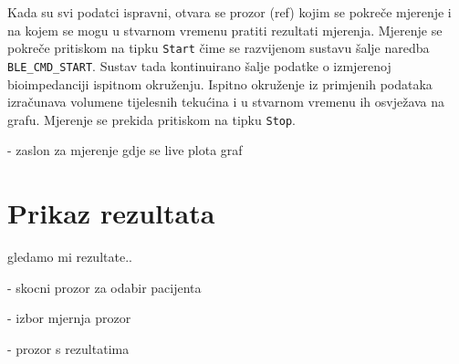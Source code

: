 \documentclass[../diplomski_rad.tex]{subfiles}
\begin{document}
Kada su svi podatci ispravni, otvara se prozor (ref) kojim se pokreče mjerenje i na kojem 
se mogu u stvarnom vremenu pratiti rezultati mjerenja. 
Mjerenje se pokreče pritiskom na tipku \texttt{Start} čime se razvijenom sustavu šalje naredba \texttt{BLE\_CMD\_START}. 
Sustav tada kontinuirano šalje podatke o izmjerenoj bioimpedanciji ispitnom okruženju. 
Ispitno okruženje iz primjenih podataka izračunava volumene tijelesnih tekućina i u stvarnom vremenu ih osvježava na grafu. 
Mjerenje se prekida pritiskom na tipku \texttt{Stop}.

- zaslon za mjerenje gdje se live plota graf

\section{Prikaz rezultata}

gledamo mi rezultate..

- skocni prozor za odabir pacijenta

- izbor mjernja prozor

- prozor s rezultatima
\end{document}
